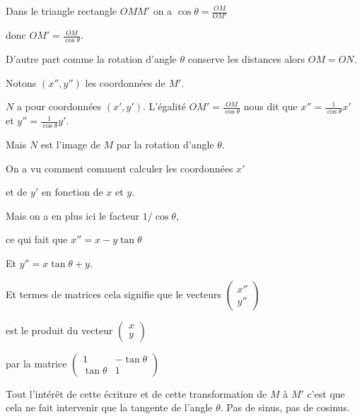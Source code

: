 \change

Dans le triangle rectangle $OMM'$ on a $\cos \theta = \frac{OM}{OM'}$ 

\change

donc $OM' = \frac{OM}{\cos \theta}$.
 
\change 
 
 D'autre part comme la rotation d'angle $\theta$ conserve les distances alors $OM=ON$. 
 
\change
 
Notons $(x'',y'')$ les coordonnées de $M'$.

\change

$N$ a pour coordonnées $(x',y')$. 
L'égalité  $OM' = \frac{OM}{\cos \theta}$ nous dit que 
$x''= \frac{1}{\cos \theta} x'$ et 
    $y''= \frac{1}{\cos \theta} y'$. 


Mais $N$ est l'image de $M$ par la rotation d'angle $\theta$.

\change

On a vu comment comment calculer les coordonnées $x'$ 

\change
et de $y'$ en fonction de $x$ et $y$.


Mais on a en plus ici le facteur $1/\cos \theta$,

\change

ce qui fait que $x'' = x - y \tan \theta$

\change

Et $y'' = x \tan \theta + y$.

\change

Et termes de matrices cela signifie que le vecteurs 
$\begin{pmatrix} x'' \\ y'' \end{pmatrix}$

est le produit du vecteur $\begin{pmatrix} x \\y \end{pmatrix}$

par la matrice $\begin{pmatrix} 1 & - \tan \theta \\ \tan \theta & 1 \end{pmatrix}$


Tout l’intérêt de cette écriture et de cette transformation de $M$ à $M'$ c'est que cela ne fait
intervenir que la tangente de l'angle $\theta$. Pas de sinus, pas de cosinus.

\diapo

